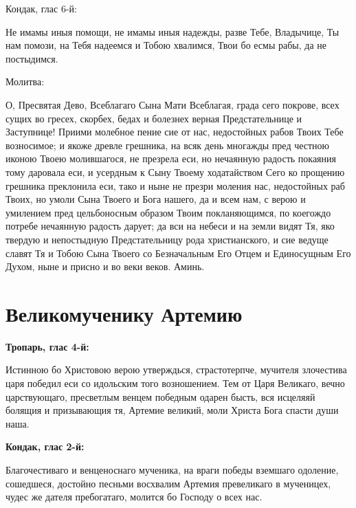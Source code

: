 \bfseries 

Кондак, глас 6-й:\normalfont{}


Не имамы иныя помощи, не имамы иныя надежды, разве Тебе, Владычице, Ты нам помози, на Тебя надеемся и Тобою хвалимся, Твои бо есмы рабы, да не постыдимся. 

\bfseries 

Молитва:\normalfont{}


О, Пресвятая Дево, Всеблагаго Сына Мати Всеблагая, града сего покрове, всех сущих во гресех, скорбех, бедах и болезнех верная Предстательнице и Заступнице! Приими молебное пение сие от нас, недостойных рабов Твоих Тебе возносимое; и якоже древле грешника, на всяк день многажды пред честною иконою Твоею молившагося, не презрела еси, но нечаянную радость покаяния тому даровала еси, и усердным к Сыну Твоему ходатайством Сего ко прощению грешника преклонила еси, тако и ныне не презри моления нас, недостойных раб Твоих, но умоли Сына Твоего и Бога нашего, да и всем нам, с верою и умилением пред цельбоносным образом Твоим покланяющимся, по коегождо потребе нечаянную радость дарует; да вси на небеси и на земли видят Тя, яко твердую и непостыдную Предстательницу рода христианского, и сие ведуще славят Тя и Тобою Сына Твоего со Безначальным Его Отцем и Единосущным Его Духом, ныне и присно и во веки веков. Аминь.



\mychapterending


 

\section{Великомученику Артемию}
 


\bfseries Тропарь, глас 4-й:\normalfont{}\nopagebreak


Истинною бо Христовою верою утверждься, страстотерпче, мучителя злочестива царя победил еси со идольским того возношением. Тем от Царя Великаго, вечно царствующаго, пресветлым венцем победным одарен бысть, вся исцеляяй болящия и призывающия тя, Артемие великий, моли Христа Бога спасти души наша.


\medskip


\bfseries Кондак, глас 2-й:\normalfont{}\nopagebreak


Благочестиваго и венценоснаго мученика, на враги победы вземшаго одоление, сошедшеся, достойно песньми восхвалим Артемия превеликаго в мученицех, чудес же дателя пребогатаго, молится бо Господу о всех нас.


